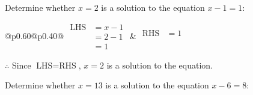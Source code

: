 \documentclass[12pt]{article}
\newcounter{minipagecount}
\begin{document}
\begin{multicols}{2}
\begin{minipage}[t]{0.40\textwidth}
    \noindent Determine whether \(x = 2\) is a solution to the equation \(x - 1 = 1\):
    \vspace{4pt}  %

    \noindent
    \renewcommand{\arraystretch}{1.3} %
    \begin{tabular}{@{}p{0.60\linewidth}@{}p{0.40\linewidth}@{}}
        \(\begin{aligned}
            \text{LHS} &= x - 1 \\
                    &= 2 - 1 \\
                    &= 1
        \end{aligned}\) &
        \(\begin{aligned}
            \text{RHS} &= 1\\
                    & \\
                    &
        \end{aligned}\)
    \end{tabular}
    \renewcommand{\arraystretch}{1.0} %
    \vspace{2pt}  %

    \noindent \(\therefore\) Since \(\text{LHS} = \text{RHS}\), \(x = 2\) is  a solution to the equation.

\end{minipage}

 \vspace*{16pt}
\noindent{(\theminipagecount)}\hspace{0.1mm} %
\begin{minipage}[t]{0.40\textwidth} %

    \noindent Determine whether \(x = 13\) is a solution to the equation \(x - 6 = 8\):
    \vspace{4pt}  %


\end{minipage}
\end{multicols}
\end{document}
